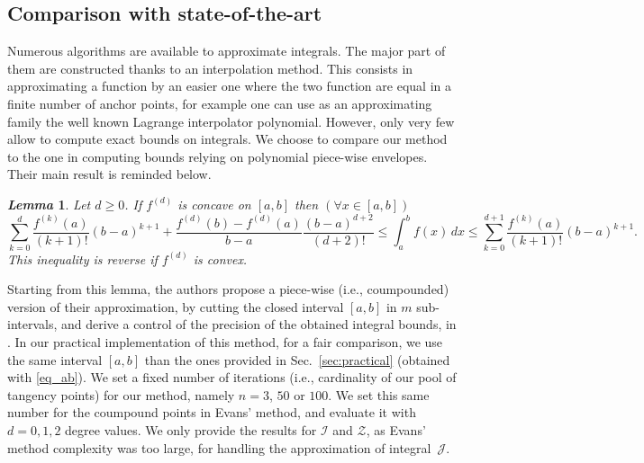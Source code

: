 \documentclass[review]{elsarticle}
\newtheorem{lemma}{\em Lemma}
\begin{document}
\subsection{Comparison with state-of-the-art}
\label{sec:expe3}
Numerous algorithms are available to approximate integrals. The major part of them are constructed thanks to an interpolation method. This consists in approximating a function by an easier one where the two function are equal in a finite number of anchor points, for example one can use as an approximating family the well known Lagrange interpolator polynomial. However, only very few allow to compute exact bounds on integrals. We choose to compare our method to the one in \cite{evans1997approximation} computing bounds relying on polynomial piece-wise envelopes. Their main result is reminded below. 
\begin{lemma}{\cite[Lem.2]{evans1997approximation}} 
Let $d \geq 0$. If $f^{(d)}$ is concave on $[a,b]$ then $(\forall x \in [a,b])$
    \begin{equation}
\sum_{k=0}^{d} \frac{f^{(k)}(a)}{(k+1)!}(b-a)^{k+1} + \frac{f^{(d)}(b) - f^{(d)}(a)}{b-a}\frac{(b-a)^{d+2}}{(d+2)!}
\leq \int_a^b f(x) \, dx \leq \sum_{k=0}^{d+1} \frac{f^{(k)}(a)}{(k+1)!}(b-a)^{k+1}.
\end{equation}
This inequality is reverse if $f^{(d)}$ is convex.
\end{lemma}
Starting from this lemma, the authors propose a piece-wise (i.e., coumpounded) version of their approximation, by cutting the closed interval $[a,b]$ in $m$ sub-intervals, and derive a control of the precision of the obtained integral bounds, in \cite[Lem.3]{evans1997approximation}. In our practical implementation of this method, for a fair comparison, we use the same interval $[a,b]$ than the ones provided in Sec.~\ref{sec:practical} (obtained with \eqref{eq_ab}). We set a fixed number of iterations (i.e., cardinality of our pool of tangency points) for our method, namely $n=3$, $50$ or $100$. We set this same number for the coumpound points in Evans' method, and evaluate it with $d=0, 1, 2$ degree values. We only provide the results for $\mathcal{I}$ and $\mathcal{Z}$, as Evans' method complexity was too large, for handling the approximation of integral~$\mathcal{J}$. 


\end{document}
